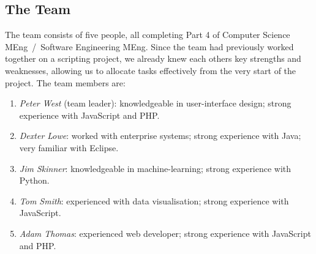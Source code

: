 


\subsection{The Team}

The team consists of five people, all completing Part 4 of Computer Science MEng~/~Software Engineering MEng. Since the team had previously worked together on a scripting project, we already knew each others key strengths and weaknesses, allowing us to allocate tasks effectively from the very start of the project. The team members are:
\begin{enumerate}
\item \textit{Peter West} (team leader): knowledgeable in user-interface design; strong experience with JavaScript and PHP.
\item \textit{Dexter Lowe}: worked with enterprise systems; strong experience with Java; very familiar with Eclipse.
\item \textit{Jim Skinner}: knowledgeable in machine-learning; strong experience with Python.
\item \textit{Tom Smith}: experienced with data visualisation; strong experience with JavaScript.
\item \textit{Adam Thomas}: experienced web developer; strong experience with JavaScript and PHP.
\end{enumerate}

